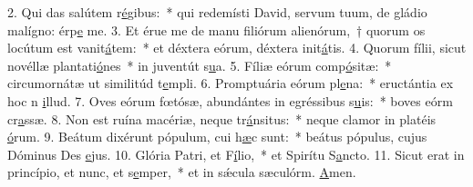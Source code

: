 2. Qui das salútem r\uline{é}gibus:~* qui redemísti David, servum tuum, de gládio malígno: érp\uline{e} me.
3. Et érue me de manu filiórum alienórum,~† quorum os locútum est vanit\uline{á}tem:~* et déxtera eórum, déxtera init\uline{á}tis.
4. Quorum fílii, sicut novéllæ plantati\uline{ó}nes~* in juventút s\uline{u}a.
5. Fíliæ eórum comp\uline{ó}sitæ:~* circumornátæ ut similitúd t\uline{e}mpli.
6. Promptuária eórum pl\uline{e}na:~* eructántia ex hoc n \uline{i}llud.
7. Oves eórum fœtósæ, abundántes in egréssibus s\uline{u}is:~* boves eórm cr\uline{a}ssæ.
8. Non est ruína macériæ, neque tr\uline{á}nsitus:~* neque clamor in platéis \uline{ó}rum.
9. Beátum dixérunt pópulum, cui h\uline{æ}c sunt:~* beátus pópulus, cujus Dóminus Des \uline{e}jus.
10. Glória Patri, et F\uline{í}lio,~* et Spirítu S\uline{a}ncto.
11. Sicut erat in princípio, et nunc, et s\uline{e}mper,~* et in sǽcula sæculórm. \uline{A}men.
